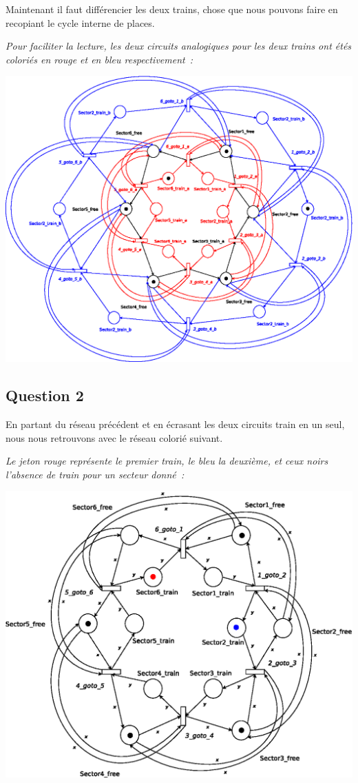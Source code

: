 Maintenant il faut différencier les deux trains, chose que nous
pouvons faire en recopiant le cycle interne de places.

\emph{Pour faciliter la lecture, les deux circuits analogiques pour
  les deux trains ont étés coloriés en rouge et en bleu
  respectivement~:}

\begin{center}
\includegraphics[height = 0.6\paperwidth]{exo8_uncoloured.eps}
\end{center}


\subsection*{Question 2}

En partant du réseau précédent et en écrasant les deux circuits
\og{}train\fg{} en un seul, nous nous retrouvons avec le réseau
colorié suivant.

\emph{Le jeton rouge représente le premier train, le bleu la deuxième, et ceux
noirs l'absence de train pour un secteur donné~:}

\begin{center}
\includegraphics[height = 0.5\paperwidth]{exo8_coloured.eps}
\end{center}

